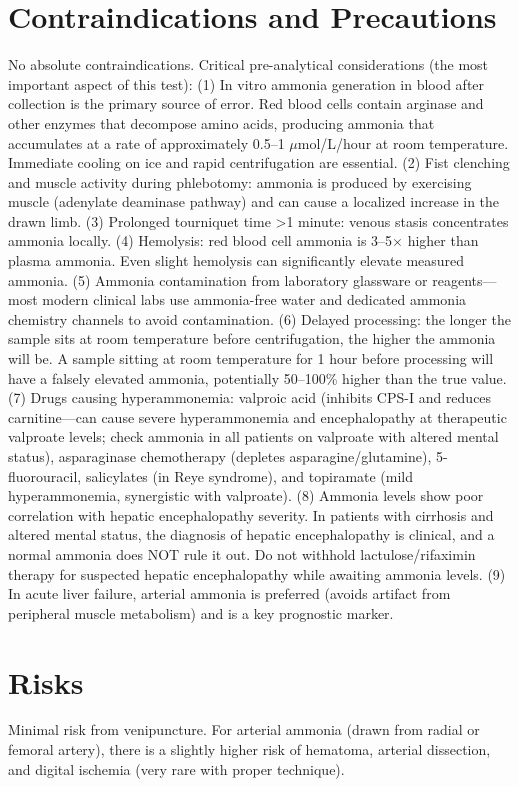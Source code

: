 \section*{Contraindications and Precautions}
No absolute contraindications. Critical pre-analytical considerations (the most important aspect of this test): (1) In vitro ammonia generation in blood after collection is the primary source of error. Red blood cells contain arginase and other enzymes that decompose amino acids, producing ammonia that accumulates at a rate of approximately 0.5--1 $\mu$mol/L/hour at room temperature. Immediate cooling on ice and rapid centrifugation are essential. (2) Fist clenching and muscle activity during phlebotomy: ammonia is produced by exercising muscle (adenylate deaminase pathway) and can cause a localized increase in the drawn limb. (3) Prolonged tourniquet time >1 minute: venous stasis concentrates ammonia locally. (4) Hemolysis: red blood cell ammonia is 3--5$\times$ higher than plasma ammonia. Even slight hemolysis can significantly elevate measured ammonia. (5) Ammonia contamination from laboratory glassware or reagents---most modern clinical labs use ammonia-free water and dedicated ammonia chemistry channels to avoid contamination. (6) Delayed processing: the longer the sample sits at room temperature before centrifugation, the higher the ammonia will be. A sample sitting at room temperature for 1 hour before processing will have a falsely elevated ammonia, potentially 50--100\% higher than the true value. (7) Drugs causing hyperammonemia: valproic acid (inhibits CPS-I and reduces carnitine---can cause severe hyperammonemia and encephalopathy at therapeutic valproate levels; check ammonia in all patients on valproate with altered mental status), asparaginase chemotherapy (depletes asparagine/glutamine), 5-fluorouracil, salicylates (in Reye syndrome), and topiramate (mild hyperammonemia, synergistic with valproate). (8) Ammonia levels show poor correlation with hepatic encephalopathy severity. In patients with cirrhosis and altered mental status, the diagnosis of hepatic encephalopathy is clinical, and a normal ammonia does NOT rule it out. Do not withhold lactulose/rifaximin therapy for suspected hepatic encephalopathy while awaiting ammonia levels. (9) In acute liver failure, arterial ammonia is preferred (avoids artifact from peripheral muscle metabolism) and is a key prognostic marker.

\section*{Risks}
Minimal risk from venipuncture. For arterial ammonia (drawn from radial or femoral artery), there is a slightly higher risk of hematoma, arterial dissection, and digital ischemia (very rare with proper technique).

